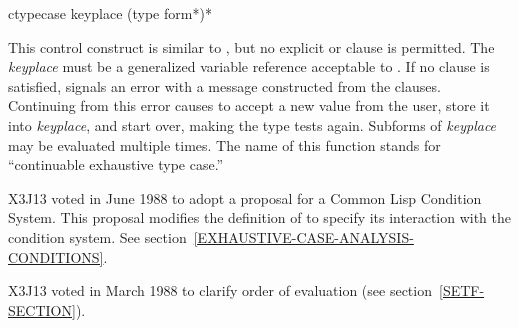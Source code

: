 \begin{defmac}
ctypecase keyplace {(type {form}*)}*

\begin{obsolete}\noindent
This control construct is similar to ,
but no explicit  or  clause is permitted.
The \emph{keyplace} must be a generalized variable reference
acceptable to .  If no clause is satisfied,  signals an
error with a message constructed from the clauses.  Continuing from this
error causes  to accept a new value from the user, store
it into \emph{keyplace}, and start over, making the type tests again.
Subforms of \emph{keyplace} may be evaluated multiple times.  The name
of this function stands for ``continuable exhaustive type case.''
\end{obsolete}

\begin{new}
X3J13 voted in June 1988
to adopt a proposal for a Common Lisp Condition System. 
This proposal modifies the definition of  to specify its
interaction with the condition system.
See section~\ref{EXHAUSTIVE-CASE-ANALYSIS-CONDITIONS}.
\end{new}

\begin{newer}
X3J13 voted in March 1988 
to clarify order of evaluation (see section~\ref{SETF-SECTION}).
\end{newer}
\end{defmac}

